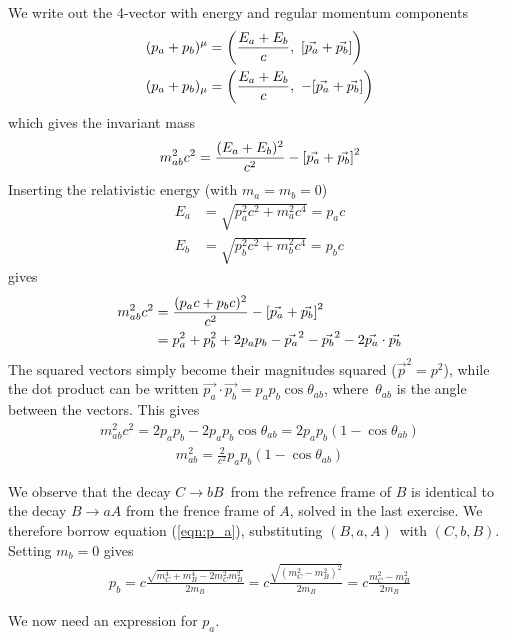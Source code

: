 \documentclass[12p,a4paper]{article}
\begin{document}
We write out the 4-vector with energy and regular momentum components
\begin{align*}
    (p_a + p_b)^\mu &= \qty(\frac{E_a + E_b}{c},\ \qty[\vec{p_a} + \vec{p_b}])\\
    (p_a + p_b)_\mu &= \qty(\frac{E_a + E_b}{c},\ -\qty[\vec{p_a} + \vec{p_b}])
\end{align*}
which gives the invariant mass
\begin{align*}
    m_{ab}^2c^2 = \frac{(E_a + E_b)^2}{c^2} - \qty[\vec{p_a} + \vec{p_b}]^2
\end{align*}
Inserting the relativistic energy (with $m_a = m_b = 0$)
\begin{align*}
    E_a &= \sqrt{p_a^2c^2 + m_a^2c^4} = p_ac \\
    E_b &= \sqrt{p_b^2c^2 + m_b^2c^4} = p_bc
\end{align*}
gives
\begin{align*}
    m_{ab}^2c^2 &= \frac{(p_ac + p_bc)^2}{c^2} - \qty[\vec{p_a} + \vec{p_b}]^2 \\
    &= p_a^2 + p_b^2 + 2p_ap_b - \vec{p_a}^2 - \vec{p_b}^2 - 2\vec{p_a}\cdot\vec{p_b}
\end{align*}
The squared vectors simply become their magnitudes squared ($\vec{p}^2 = p^2$), while the dot product can be written $\vec{p_a}\cdot\vec{p_b} = p_ap_b\cos{\theta_{ab}}$, where $\theta_{ab}$ is the angle between the vectors. This gives
\begin{align*}
    m_{ab}^2c^2 = 2p_ap_b - 2p_ap_b\cos{\theta_{ab}} = 2p_ap_b(1-\cos{\theta_{ab}})
\end{align*}
\begin{align}\label{eqn:m_ab}
    m_{ab}^2 = \frac{2}{c^2}p_ap_b(1-\cos{\theta_{ab}})
\end{align}

We observe that the decay $C \rightarrow bB$ from the refrence frame of $B$ is identical to the decay $B \rightarrow aA$ from the frence frame of $A$, solved in the last exercise. We therefore borrow equation (\ref{eqn:p_a}), substituting $(B, a, A)$ with $(C, b, B)$. Setting $m_b = 0$ gives
\begin{align}
    p_b = c\frac{\sqrt{m_C^4 + m_B^4 - 2m_C^2m_B^2}}{2m_B} = c\frac{\sqrt{(m_C^2 - m_B^2)^2}}{2m_B} = c\frac{m_C^2 - m_B^2}{2m_B}
\end{align}

We now need an expression for $p_a$.
\end{document}
